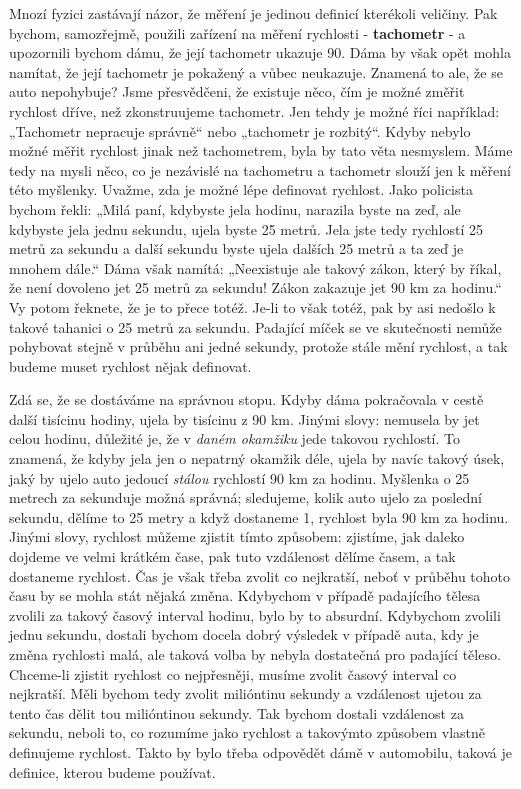     Mnozí fyzici zastávají názor, že měření je jedinou definicí kterékoli veličiny. Pak bychom, 
    samozřejmě, použili zařízení na měření rychlosti - \textbf{tachometr} - a upozornili bychom 
    dámu, že její tachometr ukazuje \num{90}. Dáma by však opět mohla namítat, že její tachometr je 
    pokažený a vůbec neukazuje. Znamená to ale, že se auto nepohybuje? Jsme přesvědčeni, že 
    existuje něco, čím je možné změřit rychlost dříve, než zkonstruujeme tachometr. Jen tehdy je 
    možné říci například: „Tachometr nepracuje správně“ nebo „tachometr je rozbitý“. Kdyby nebylo 
    možné měřit rychlost jinak než tachometrem, byla by tato věta nesmyslem. Máme tedy na mysli 
    něco, co je nezávislé na tachometru a tachometr slouží jen k měření této myšlenky. Uvažme, zda 
    je možné lépe definovat rychlost. Jako policista bychom řekli: „Milá paní, kdybyste jela 
    hodinu, narazila byste na zeď, ale kdybyste jela jednu sekundu, ujela byste \num{25} metrů. 
    Jela jste tedy rychlostí \num{25} metrů za sekundu a další sekundu byste ujela dalších \num{25} 
    metrů a ta zeď je mnohem dále.“ Dáma však namítá: „Neexistuje ale takový zákon, který by říkal, 
    že není dovoleno jet \num{25} metrů za sekundu! Zákon zakazuje jet \num{90} km za hodinu.“ Vy 
    potom řeknete, že je to přece totéž. Je-li to však totéž, pak by asi nedošlo k takové tahanici 
    o \num{25} metrů za sekundu. Padající míček se ve skutečnosti nemůže pohybovat stejně v průběhu 
    ani jedné sekundy, protože stále mění rychlost, a tak budeme muset rychlost nějak definovat.
    
    Zdá se, že se dostáváme na správnou stopu. Kdyby dáma pokračovala v cestě další tisícinu 
    hodiny, ujela by tisícinu z \num{90} km. Jinými slovy: nemusela by jet celou hodinu, důležité 
    je, že v \emph{daném okamžiku} jede takovou rychlostí. To znamená, že kdyby jela jen o nepatrný 
    okamžik déle, ujela by navíc takový úsek, jaký by ujelo auto jedoucí \emph{stálou} rychlostí 
    \num{90} km za hodinu. Myšlenka o \num{25} metrech za sekunduje možná správná; sledujeme, kolik 
    auto ujelo za poslední sekundu, dělíme to \num{25} metry a když dostaneme \num{1}, rychlost 
    byla \num{90} km za hodinu. Jinými slovy, rychlost můžeme zjistit tímto způsobem: zjistíme, jak 
    daleko dojdeme ve velmi krátkém čase, pak tuto vzdálenost dělíme časem, a tak dostaneme 
    rychlost. Čas je však třeba zvolit co nejkratší, neboť v průběhu tohoto času by se mohla stát 
    nějaká změna. Kdybychom v případě padajícího tělesa zvolili za takový časový interval hodinu, 
    bylo by to absurdní. Kdybychom zvolili jednu sekundu, dostali bychom docela dobrý výsledek v 
    případě auta, kdy je změna rychlosti malá, ale taková volba by nebyla dostatečná pro padající 
    těleso. Chceme-li zjistit rychlost co nejpřesněji, musíme zvolit časový interval co nejkratší. 
    Měli bychom tedy zvolit milióntinu sekundy a vzdálenost ujetou za tento čas dělit tou 
    milióntinou sekundy. Tak bychom dostali vzdálenost za sekundu, neboli to, co rozumíme jako 
    rychlost a takovýmto způsobem vlastně definujeme rychlost. Takto by bylo třeba odpovědět dámě v 
    automobilu, taková je definice, kterou budeme používat.
    
